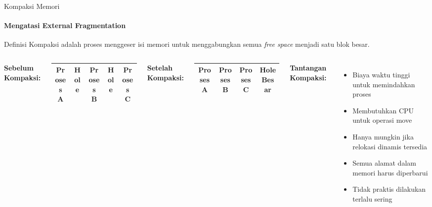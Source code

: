 \documentclass[10pt,aspectratio=169]{beamer}
\begin{document}
\begin{frame}{Kompaksi Memori}
    \framesubtitle{Mengatasi External Fragmentation}
    
    \begin{block}{Definisi}
        Kompaksi adalah proses menggeser isi memori untuk menggabungkan semua \textit{free space} menjadi satu blok besar.
    \end{block}
    
    \begin{columns}[T]
            \textbf{Sebelum Kompaksi:}
            \begin{center}
                \begin{tabular}{|c|c|c|c|c|}
                \hline
                Proses A & \cellcolor{gray!30}Hole & Proses B & \cellcolor{gray!30}Hole & Proses C \\
                \hline
                \end{tabular}
            \end{center}
            
            \textbf{Setelah Kompaksi:}
            \begin{center}
                \begin{tabular}{|c|c|c|c|}
                \hline
                Proses A & Proses B & Proses C & \cellcolor{gray!30}Hole Besar \\
                \hline
                \end{tabular}
            \end{center}
            
            \textbf{Tantangan Kompaksi:}
            \begin{itemize}
                \item Biaya waktu tinggi untuk memindahkan proses
                \item Membutuhkan CPU untuk operasi move
                \item Hanya mungkin jika relokasi dinamis tersedia
                \item Semua alamat dalam memori harus diperbarui
                \item Tidak praktis dilakukan terlalu sering
            \end{itemize}
    \end{columns}
\end{frame}
\end{document}
